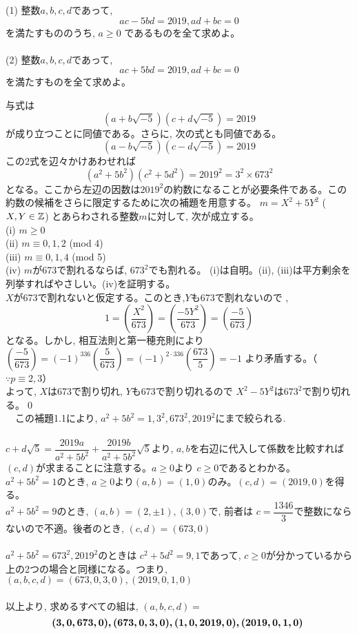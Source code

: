 (1) 整数$a,b,c,d$であって,
\[ac-5bd=2019,　　ad+bc=0\]
を満たすもののうち, $a\geq 0$ であるものを全て求めよ。\\
\\
(2) 整数$a,b,c,d$であって,
\[ac+5bd=2019,　　ad+bc=0\]
を満たすものを全て求めよ。
\enthm

与式は
\[(a+b\sqrt{-5})(c+d\sqrt{-5})=2019\]
が成り立つことに同値である。さらに, 次の式とも同値である。
\[(a-b\sqrt{-5})(c-d\sqrt{-5})=2019\]
この2式を辺々かけあわせれば
\[(a^2+5b^2)(c^2+5d^2)=2019^2=3^2\times 673^2\]
となる。ここから左辺の因数は$2019^2$の約数になることが必要条件である。この約数の候補をさらに限定するために次の補題を用意する。 
$m=X^2+5Y^2$ ($X,Y\in \mathbb{Z}$) とあらわされる整数$m$に対して, 次が成立する。\\
(i) $m\geq 0$\\
(ii) $m\equiv 0,1,2$ (mod 4)\\
(iii) $m\equiv 0,1,4$ (mod 5)\\
(iv) $m$が673で割れるならば, $673^2$でも割れる。
\enthm
(i)は自明。(ii), (iii)は平方剰余を列挙すればやさしい。(iv)を証明する。\\
$X$が673で割れないと仮定する。このとき,$Y$も673で割れないので
,\[1=\left(\dfrac{X^2}{673}\right)=\left(\dfrac{-5Y^2}{673}\right)=\left(\dfrac{-5}{673}\right)\]
となる。しかし, 相互法則と第一穂充則により $\left(\dfrac{-5}{673}\right)=(-1)^{336}\left(\dfrac{5}{673}\right)=(-1)^{2\cdot 336}\left(\dfrac{673}{5}\right)=-1$ より矛盾する。（$\because p\equiv 2,3$）\\
よって, $X$は673で割り切れ, $Y$も673で割り切れるので $X^2-5Y^2$は$673^2$で割り切れる。\qed\\
　この補題1.1により, $a^2+5b^2=1,3^2,673^2,2019^2$にまで絞られる.\\
\\
$c+d\sqrt{5}=\dfrac{2019a}{a^2+5b^2}+\dfrac{2019b}{a^2+5b^2}\sqrt{5}$より, $a,b$を右辺に代入して係数を比較すれば$(c,d)$が求まることに注意する。$a\geq 0$より $c\geq 0$であるとわかる。\\
$a^2+5b^2=1$のとき, $a\geq 0 $より$(a,b)=(1,0)$のみ。$(c,d)=(2019,0)$を得る。
\\
$a^2+5b^2=9$のとき, $(a,b)=(2,\pm 1), (3,0)$で, 前者は $c=\dfrac{1346}{3}$で整数にならないので不適。後者のとき, $(c,d)=(673, 0)$\\
\\
$a^2+5b^2=673^2, 2019^2$のときは $c^2+5d^2=9,1$であって, $c\geq 0$が分かっているから上の2つの場合と同様になる。つまり, $(a,b,c,d)=(673,0,3,0), (2019,0,1,0)$\\
\\
以上より, 求めるすべての組は, $(a,b,c,d)=$
\[\mbox{{\boldmath  $(3,0,673,0),(673,0,3,0),(1,0,2019,0),(2019,0,1,0)$} }\]

